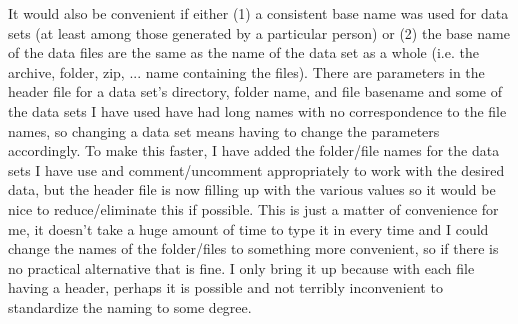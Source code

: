 \documentclass{article}
\begin{document}
It would also be convenient if either (1) a consistent base name was used for data sets (at least among those generated by a particular person) or (2) the base name of the data files are the same as the name of the data set as a whole (i.e. the archive, folder, zip, ... name containing the files).  There are parameters in the header file for a data set's directory, folder name, and file basename and some of the data sets I have used have had long names with no correspondence to the file names, so changing a data set means having to change the parameters accordingly.  To make this faster, I have added the folder/file names for the data sets I have use and comment/uncomment appropriately to work with the desired data, but the header file is now filling up with the various values so it would be nice to reduce/eliminate this if possible.  This is just a matter of convenience for me, it doesn't take a huge amount of time to type it in every time and I could change the names of the folder/files to something more convenient, so if there is no practical alternative that is fine.  I only bring it up because with each file having a header, perhaps it is possible and not terribly inconvenient to standardize the naming to some degree.
\end{document}
